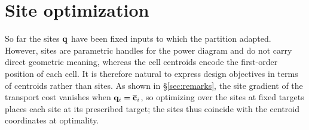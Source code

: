 \documentclass[main.tex]{subfiles}
\begin{document}
\section{Site optimization}
\label{sec:site-min}

So far the sites $\mathbf{q}$ have been fixed inputs to which the partition adapted.
However, sites are parametric handles for the power diagram and do not carry direct geometric meaning, whereas the cell centroids encode the first-order position of each cell.
It is therefore natural to express design objectives in terms of centroids rather than sites.
As shown in \S\ref{sec:remarks}, the site gradient of the transport cost vanishes when $\mathbf{q}_i = \overline{\mathbf{c}}_i$, so optimizing over the sites at fixed targets places each site at its prescribed target; the sites thus coincide with the centroid coordinates at optimality.
\end{document}
